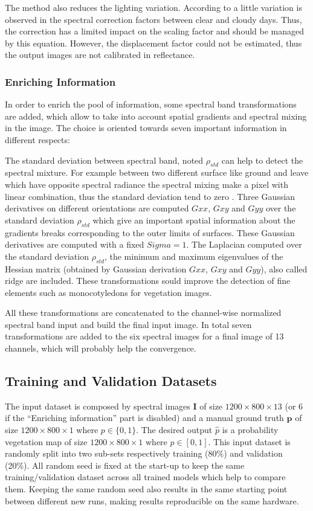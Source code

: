 \documentclass[../thesis.tex]{subfiles}
\begin{document}
	The method also reduces the lighting variation. According to \cite{Blackburn2012} a little variation is observed in the spectral correction factors between clear and cloudy days. Thus, the correction has a limited impact on the scaling factor and should be managed by this equation. However, the displacement factor could not be estimated, thus the output images are not calibrated in reflectance.
	
	\subsubsection{Enriching Information} In order to enrich the pool of information, some spectral band transformations are added, which allow to take into account spatial gradients and spectral mixing \cite{Milioto2017} in the image. The choice is oriented towards seven important information in different respects:
	
	The standard deviation between spectral band, noted $\rho_{std}$ can help to detect the spectral mixture. For example between two different surface like ground and leave which have opposite spectral radiance the spectral mixing make a pixel with linear combination, thus the standard deviation tend to zero \cite{Louargant2017}.
	Three Gaussian derivatives on different orientations are computed $Gxx$, $Gxy$ and $Gyy$ over the standard deviation $\rho_{std}$ which give an important spatial information about the gradients breaks corresponding to the outer limits of surfaces. These Gaussian derivatives are computed with a fixed  $Sigma=1$.
	The Laplacian computed over the standard deviation $\rho_{std}$, the minimum and maximum eigenvalues of the Hessian matrix (obtained by Gaussian derivation $Gxx$, $Gxy$ and $Gyy$), also called ridge are included. These transformations sould improve the detection of fine elements \cite{LinVessel} such as monocotyledons for vegetation images.
	
	All these transformations are concatenated to the channel-wise normalized spectral band input and build the final input image. In total seven transformations are added to the six spectral images for a final image of 13 channels, which will probably help the convergence.
	
	\subsection{Training and Validation Datasets}
	The input dataset is composed by spectral images $\mathbf{I}$ of size $1200 \times 800 \times 13$ (or 6 if the ``Enriching information'' part is disabled) and a manual ground truth $\mathbf{p}$ of size $1200 \times 800 \times 1$  {where} $p \in \{0,1\}$. The desired output $\hat{p}$ is a probability vegetation map of size $1200 \times 800 \times 1$ where $\hat{p} \in [0,1]$. This input dataset is randomly split into two sub-sets respectively training (80\%) and validation (20\%). All random seed is fixed at the start-up to keep the same training/validation dataset across all trained models which help to compare them. Keeping the same random seed also results in the same starting point between different new runs, making results reproducible on the same hardware.%
	
\end{document}
